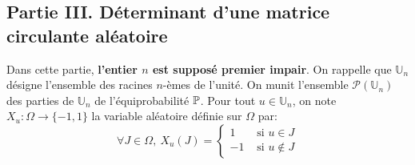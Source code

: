 \subsection*{Partie III. Déterminant d'une matrice circulante aléatoire}

Dans cette partie, {\bf l'entier $n$ est supposé premier impair}.\newline
On rappelle que $\mathbb{U}_{n}$ désigne l'ensemble des racines $n$-èmes de l'unité.\newline
On munit l'ensemble $\mathcal{P}(\mathbb{U}_{n})$ des parties de $\mathbb{U}_{n}$ de l'équiprobabilité $\mathbb{P}$.\newline
Pour tout $u\in \mathbb{U}_{n}$, on note $X_{u}:\Omega \to \{ -1, 1\}$ la variable aléatoire définie sur $\Omega$ par:
\[
\forall J\in \Omega,\ 
  X_{u}(J) = 
    \left \lbrace
      \begin{aligned}
         1 & \text{ si } u\in J\\
        -1 & \text{ si } u\not \in J 
      \end{aligned}
    \right.
\]

